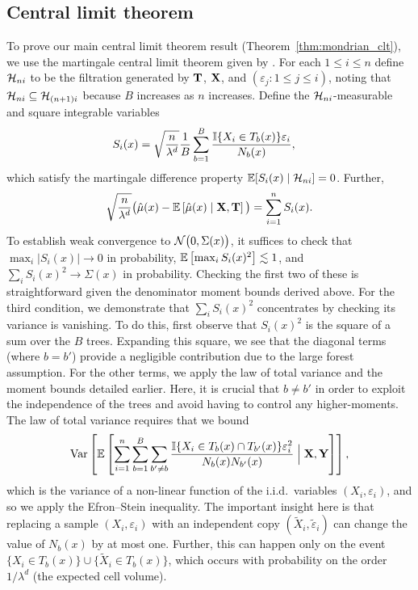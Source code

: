 \subsection*{Central limit theorem}

To prove our main central limit theorem result
(Theorem~\ref{thm:mondrian_clt}), we use
the martingale central limit theorem given by
\citet[Theorem~3.2]{hall1980martingale}. For each $1 \leq i \leq n$ define
$\mathcal{H}_{n i}$ to be the filtration generated by $\mathbf{T}$, $\mathbf{X}$, and
$(\varepsilon_j : 1 \leq j \leq i)$, noting that
$\mathcal{H}_{n i} \subseteq \mathcal{H}_{(n+1)i}$ because $B$ increases as $n$ increases.
Define the $\mathcal{H}_{n i}$-measurable and square integrable variables
%
\begin{align*}
  S_i(x) &=
  \sqrt{\frac{n}{\lambda^d}} \frac{1}{B} \sum_{b=1}^B
  \frac{\mathbb{I} \{X_i \in T_b(x)\} \varepsilon_i} {N_{b}(x)},
\end{align*}
%
which satisfy the martingale difference property
$\mathbb{E} [ S_i(x) \mid \mathcal{H}_{n i} ] = 0$. Further,
%
\begin{align*}
  \sqrt{\frac{n}{\lambda^d}}
  \big(
    \hat\mu(x)
    - \mathbb{E}\left[
      \hat\mu(x) \mid \mathbf{X}, \mathbf{T}
    \right]
  \big)
  = \sum_{i=1}^n S_i(x).
\end{align*}
%
To establish weak convergence to $\mathcal{N}\big(0, \Sigma(x)\big)$,
it suffices to check that $\max_i |S_i(x)| \to 0$ in probability,
$\mathbb{E}\left[\max_i S_i(x)^2\right] \lesssim 1$,
and $\sum_i S_i(x)^2 \to \Sigma(x)$ in probability.
Checking the first two of these is straightforward given the denominator moment
bounds derived above. For the third condition, we demonstrate that
$\sum_i S_i(x)^2$ concentrates by checking its variance is vanishing. To do
this, first observe that $S_i(x)^2$ is the square of a sum over the $B$ trees.
Expanding this square, we see that the diagonal terms (where $b = b'$) provide
a negligible contribution due to the large forest assumption. For the other
terms, we apply the law of total variance and the moment bounds detailed
earlier. Here, it is crucial that $b \neq b'$ in order to exploit the
independence of the trees and avoid having to control any higher-moments. The
law of total variance requires that we bound
%
\begin{align*}
  \operatorname{Var} \left[
    \mathbb{E} \left[
      \sum_{i=1}^n \sum_{b=1}^B \sum_{b' \neq b}
      \frac{\mathbb{I}\{X_i \in T_b(x) \cap T_{b'}(x)\} \varepsilon_i^2}
      {N_{b}(x) N_{b'}(x)} \Bigm| \mathbf{X}, \mathbf{Y}
    \right]
  \right],
\end{align*}
%
which is the variance of a non-linear function of the i.i.d.\ variables
$(X_i, \varepsilon_i)$, and so we apply the Efron--Stein inequality.
The important insight here is that replacing a sample
$(X_i, \varepsilon_i)$ with an independent copy
$(\tilde X_i, \tilde \varepsilon_i)$ can change the value of
$N_b(x)$ by at most one. Further, this can happen only on the event
$\{ X_i \in T_{b}(x) \} \cup \{ \tilde X_i \in T_{b}(x) \}$,
which occurs with probability on the order $1/\lambda^d$
(the expected cell volume).

